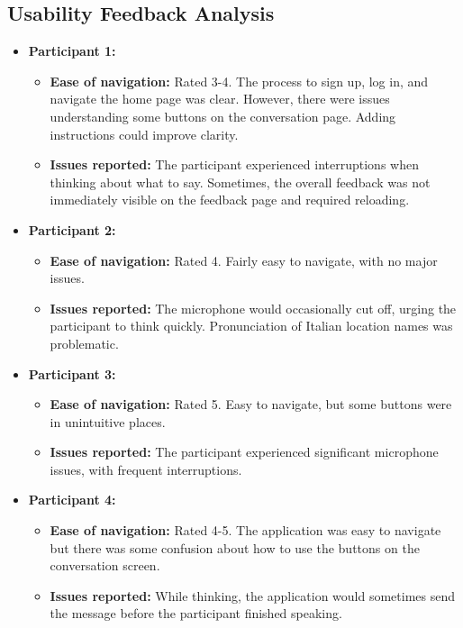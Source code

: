 \documentclass{article}
\begin{document}
\subsection{Usability Feedback Analysis}
\begin{itemize}
    \item \textbf{Participant 1:}
    \begin{itemize}
        \item \textbf{Ease of navigation:} Rated 3-4. The process to sign up, log in, and navigate the home page was clear. However, there were issues understanding some buttons on the conversation page. Adding instructions could improve clarity.
        \item \textbf{Issues reported:} The participant experienced interruptions when thinking about what to say. Sometimes, the overall feedback was not immediately visible on the feedback page and required reloading.
    \end{itemize}
    \item \textbf{Participant 2:}
    \begin{itemize}
        \item \textbf{Ease of navigation:} Rated 4. Fairly easy to navigate, with no major issues.
        \item \textbf{Issues reported:} The microphone would occasionally cut off, urging the participant to think quickly. Pronunciation of Italian location names was problematic.
    \end{itemize}
    \item \textbf{Participant 3:}
    \begin{itemize}
        \item \textbf{Ease of navigation:} Rated 5. Easy to navigate, but some buttons were in unintuitive places.
        \item \textbf{Issues reported:} The participant experienced significant microphone issues, with frequent interruptions.
    \end{itemize}
    \item \textbf{Participant 4:}
    \begin{itemize}
        \item \textbf{Ease of navigation:} Rated 4-5. The application was easy to navigate but there was some confusion about how to use the buttons on the conversation screen.
        \item \textbf{Issues reported:} While thinking, the application would sometimes send the message before the participant finished speaking.
    \end{itemize}
\end{itemize}
\end{document}
